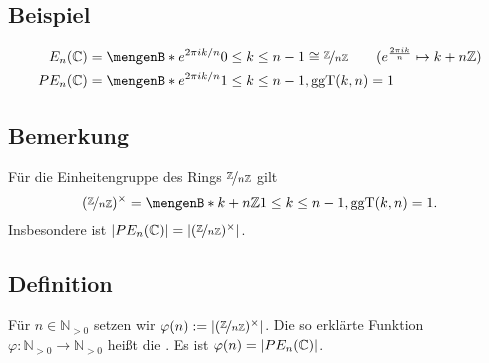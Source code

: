 \subsection[Beispiel: Einheitswurzeln in $\mathds{C}$]{Beispiel} %
\label{sub:193}
\begin{align*}
	E_n(\mathds{C}) &= \set[e^{2 \pi i k /n}]{0 \le k \le n-1} \cong \nicefrac{\mathds{Z}}{n \mathds{Z}} \tag{$e^{\frac{2 \pi i k}{n} } \mapsto k+ n \mathds{Z}$} \\
	PE_n(\mathds{C}) &= \set[e^{2 \pi i k /n}]{1 \le k \le n-1 , \ggT(k,n)=1}  
\end{align*}

\subsection[Bemerkung: Vergleich der Einheiten in $\nicefrac{\mathds{Z}}{n \mathds{Z}}$ mit $PE_n(\mathds{C})$]{Bemerkung} %
\label{sub:194}
Für die Einheitengruppe des Rings $\nicefrac{\mathds{Z}}{n \mathds{Z}}$ gilt
\[
	\enbrace{\nicefrac{\mathds{Z}}{n \mathds{Z}}}^\times = \set[k+ n \mathds{Z}]{1 \le k \le n-1, \ggT(k,n)=1}.  
\]
Insbesondere ist $\lvert PE_n(\mathbb{C})\rvert = \lvert(\nicefrac{\mathbb{Z}}{n \mathbb{Z}})^\times\rvert$.

\subsection[Definition: Eulersche $\varphi$-Funktion]{Definition} %
\label{sub:195}
Für $n \in \mathds{N}_{>0}$ setzen wir $\varphi(n) := \lvert (\nicefrac{\mathbb{Z}}{n \mathbb{Z}})^\times\rvert $. Die so erklärte Funktion 
$\varphi : \mathds{N}_{>0} \to \mathds{N}_{>0}$ heißt die . Es ist $\varphi(n) = \lvert PE_n(\mathbb{C})\rvert $.

